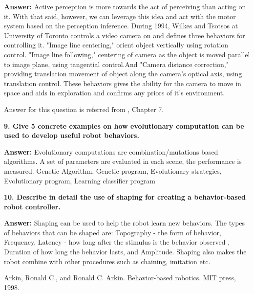 \documentclass[a4paper, 10pt]{article}
\begin{document}
\textbf{Answer:} 
Active perception is more towards the act of perceiving than acting on it. With that said, however, we can leverage this idea and act with the motor system based on the perception inference. During 1994, Wilkes and Tsotsos at University of Toronto controls a video camera on and defines three behaviors for controlling it. "Image line centering," orient object vertically using rotation control. "Image line following," centering of camera as the object is moved parallel to image plane, using tangential control.And "Camera distance correction," providing translation movement of object along the camera's optical axis, using translation control. These behaviors gives the ability for the camera to move in space and aids in exploration and confirms any priors of it's environment. 

Answer for this question is referred from \cite{arkin}, Chapter 7.


\hfill

\textbf{9. Give 5 concrete examples on how evolutionary computation can be used to develop useful robot behaviors.}

\textbf{Answer:} Evolutionary computations are combination/mutations based algorithms. A set of parameters are evaluated in each scene, the performance is measured. Genetic Algorithm, Genetic program, Evolutionary strategies, Evolutionary program, Learning classifier program 

\hfill 

\textbf{10. Describe in detail the use of shaping for creating a behavior-based robot controller.}

\textbf{Answer:} Shaping can be used to help the robot learn new behaviors. The types of behaviors that can be shaped are: Topography - the form of behavior, Frequency, Latency - how long after the stimulus is the behavior observed , Duration of how long the behavior lasts, and Amplitude. Shaping also makes the robot combine with other procedures such as chaining, imitation etc. 

\begin{thebibliography}{9}
Arkin, Ronald C., and Ronald C. Arkin. Behavior-based robotics. MIT press, 1998.
\end{thebibliography}
\end{document}

